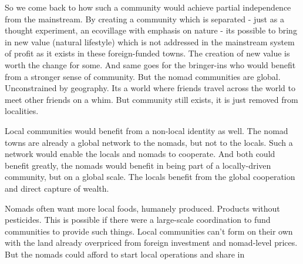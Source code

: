 So we come back to how such a community would achieve partial independence from the mainstream. By creating a community which is separated - just as a thought experiment, an ecovillage with emphasis on nature - its possible to bring in new value (natural lifestyle) which is not addressed in the mainstream system of profit as it exists in these foreign-funded towns. The creation of new value is worth the change for some. And same goes for the bringer-ins who would benefit from a stronger sense of community. But the nomad communities are global. Unconstrained by geography. Its a world where friends travel across the world to meet other friends on a whim. But community still exists, it is just removed from localities.

Local communities would benefit from a non-local identity as well. The nomad towns are already a global network to the nomads, but not to the locals. Such a network would enable the locals and nomads to cooperate. And both could benefit greatly, the nomads would benefit in being part of a locally-driven community, but on a global scale. The locals benefit from the global cooperation and direct capture of wealth.

Nomads often want more local foods, humanely produced. Products without pesticides. This is possible if there were a large-scale coordination to fund communities to provide such things. Local communities can't form on their own with the land already overpriced from foreign investment and nomad-level prices. But the nomads could afford to start local operations and share in

